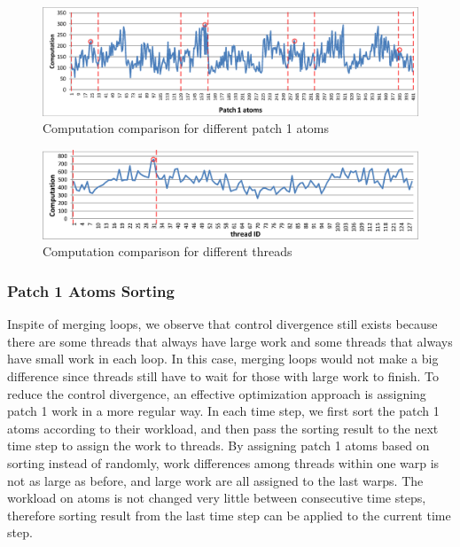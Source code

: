 \begin{figure}[h]
\centering
\setlength{\abovecaptionskip}{-1pt}
\setlength{\belowcaptionskip}{-2pt}
\includegraphics[width=6.0in]{figs/patch1_count.eps}
\caption{Computation comparison for different patch 1 atoms}
\label{figs:patch1-count}
\vspace{-0.5cm}
\end{figure}

\begin{figure}[h]
\centering
\setlength{\abovecaptionskip}{-1pt}
\setlength{\belowcaptionskip}{-2pt}
\includegraphics[width=6.0in]{figs/thread_count.eps}
\caption{Computation comparison for different threads}
\label{figs:thread-count}
\vspace{-0.5cm}
\end{figure}

\subsubsection{Patch 1 Atoms Sorting}

Inspite of merging loops, we observe that control divergence still exists because there are some threads that always have large work and some threads
that always have small work in each loop. In this case, merging loops would not make a big difference since threads still have to wait for those with
large work to finish. To reduce the control divergence, an effective optimization approach is assigning patch 1 work in a more regular way.
In each time step, we first sort the patch 1 atoms according to their workload, and then pass the sorting result to the next time step to assign the work to threads.
By assigning patch 1 atoms based on sorting instead of randomly, work differences among threads within one warp is not as large as before, and large work
are all assigned to the last warps. The workload on atoms is not changed very little between consecutive time steps, therefore sorting result from the last time step
can be applied to the current time step. 
